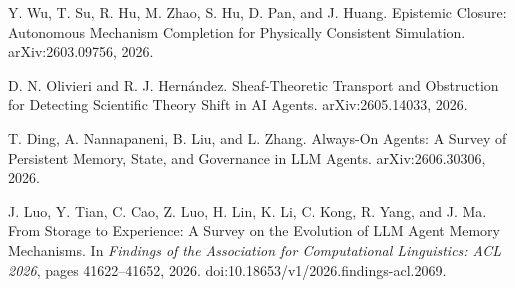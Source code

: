  Y. Wu, T. Su, R. Hu, M. Zhao, S. Hu, D. Pan, and J. Huang. Epistemic Closure: Autonomous Mechanism Completion for Physically Consistent Simulation. arXiv:2603.09756, 2026.

 D. N. Olivieri and R. J. Hern\'andez. Sheaf-Theoretic Transport and Obstruction for Detecting Scientific Theory Shift in AI Agents. arXiv:2605.14033, 2026.

 T. Ding, A. Nannapaneni, B. Liu, and L. Zhang. Always-On Agents: A Survey of Persistent Memory, State, and Governance in LLM Agents. arXiv:2606.30306, 2026.

 J. Luo, Y. Tian, C. Cao, Z. Luo, H. Lin, K. Li, C. Kong, R. Yang, and J. Ma. From Storage to Experience: A Survey on the Evolution of LLM Agent Memory Mechanisms. In \emph{Findings of the Association for Computational Linguistics: ACL 2026}, pages 41622--41652, 2026. doi:10.18653/v1/2026.findings-acl.2069.

